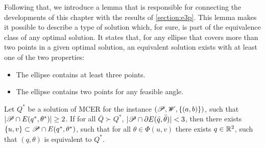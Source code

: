 
Following that, we introduce a lemma that is responsible for connecting the developments of this chapter with the results of \autoref{section:e3p}.
This lemma makes it possible to describe a type of solution which, for sure, is part of the equivalence class of any optimal solution.
It states that, for any ellipse that covers more than two points in a given optimal solution, an equivalent solution exists with at least one of the two properties:
\begin{itemize}
	\item The ellipse contains at least three points.
	\item The ellipse contains two points for any feasible angle.
\end{itemize}


\begin{lem}\label{lema:3pnts}
	Let $Q^*$ be a solution of MCER for the instance $(\mathscr{P}, \mathscr{W}, \{(a, b)\})$, such that $|\mathscr{P} \cap E(q^*, \theta^*)|\ge2$.
	If for all $\bar{Q} \succ Q^*$, $|\mathscr{P} \cap \partial E(\bar{q}, \bar{\theta})| < 3$, then there exists $\{u, v\} \subset \mathscr{P} \cap E(q^*, \theta^*)$, such that for all $\theta\in \Phi(u,v)$ there exists $q \in \mathbb{R}^2$, such that $(q, \theta)$ is equivalent to $Q^*$.
\end{lem}

